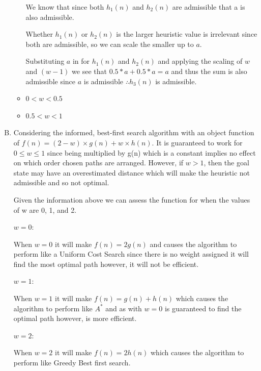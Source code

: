 \documentclass[10pt,a4paper]{article}
\begin{document}
\begin{enumerate}[A.]
\begin{itemize}
			We know that since both $h_1(n)$ and $h_2(n)$ are admissible that a is also admissible.  
			
			Whether $h_1(n)$ or $h_2(n)$ is the larger heuristic value is irrelevant since both are admissible, so we can scale the smaller up to $a$.
			
			Substituting $a$ in for $h_1(n)$ and $h_2(n)$ and applying the scaling of $w$ and $(w - 1)$ we see that $0.5*a + 0.5*a = a$ and thus the sum is also admissible since $a$ is admissible $\therefore h_3(n)$ is admissible.
			
			\item
			
			$0 < w < 0.5$
			
			
			
			\item 
			
			$0.5 < w < 1$
			
		\end{itemize}
			
		
		
		\item
		Considering the informed, best-first search algorithm with an object function of $f(n) = (2-w) \times g(n) + w \times h(n)$. It is guaranteed to work for $0 \leq w \leq 1$ since being multiplied by g(n) which is a constant implies no effect on which order chosen paths are arranged. However, if $w > 1$, then the goal state may have an overestimated distance which will make the heuristic not admissible and so not optimal.
		
		Given the information above we can assess the function for when the values of w are 0, 1, and 2.
		
		$w = 0$:
		
		When $w = 0$ it will make $f(n) = 2g(n)$ and causes the algorithm to perform like a Uniform Cost Search since there is no weight assigned it will find the most optimal path however, it will not be efficient.
		
		$w = 1$:

		When $w = 1$ it will make $f(n) = g(n) + h(n)$ which causes the algorithm to perform like $A^*$ and as with $w=0$ is guaranteed to find the optimal path however, is more efficient.
		
		$w = 2$: 
		
		When $w = 2$ it will make $f(n) = 2h(n)$ which causes the algorithm to perform like Greedy Best first search.
		
	\end{enumerate}
		
\end{document}
